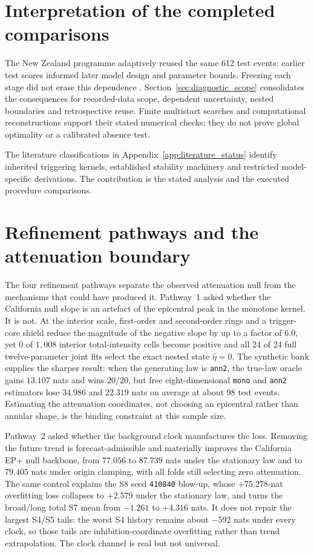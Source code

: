 \section{Interpretation of the completed comparisons}

The New Zealand programme adaptively reused the same 612 test events: earlier test scores informed later model design and parameter bounds. Freezing each stage did not erase this dependence \citep{Dwork2015}. Section~\ref{sec:diagnostic_scope} consolidates the consequences for recorded-data scope, dependent uncertainty, nested boundaries and retrospective reuse. Finite multistart searches and computational reconstructions support their stated numerical checks; they do not prove global optimality or a calibrated absence test.


The literature classifications in Appendix~\ref{app:literature_status} identify inherited triggering kernels, established stability machinery and restricted model-specific derivations. The contribution is the stated analysis and the executed procedure comparisons.



\section{Refinement pathways and the attenuation boundary}\label{sec:discussion-pathways}

The four refinement pathways separate the observed attenuation null from the mechanisms that could have produced it. Pathway~1 asked whether the California null slope is an artefact of the epicentral peak in the monotone kernel. It is not. At the interior scale, first-order and second-order rings and a trigger-core shield reduce the magnitude of the negative slope by up to a factor of $6.0$, yet $0$ of $1{,}008$ interior total-intensity cells become positive and all $24$ of $24$ full twelve-parameter joint fits select the exact nested state $\hat\eta=0$. The synthetic bank supplies the sharper result: when the generating law is \texttt{ann2}, the true-law oracle gains $13.107$ nats and wins $20/20$, but free eight-dimensional \texttt{mono} and \texttt{ann2} estimators lose $34.986$ and $22.319$ nats on average at about $98$ test events. Estimating the attenuation coordinates, not choosing an epicentral rather than annular shape, is the binding constraint at this sample size.

Pathway~2 asked whether the background clock manufactures the loss. Removing the future trend is forecast-admissible and materially improves the California EP+ null backbone, from $77.056$ to $87.739$ nats under the stationary law and to $79.405$ nats under origin clamping, with all folds still selecting zero attenuation. The same control explains the S8 seed \texttt{410840} blow-up, whose $+75.278$-nat overfitting loss collapses to $+2.579$ under the stationary law, and turns the broad/long total S7 mean from $-1.261$ to $+4.316$ nats. It does not repair the largest S4/S5 tails: the worst S4 history remains about $-592$ nats under every clock, so those tails are inhibition-coordinate overfitting rather than trend extrapolation. The clock channel is real but not universal.

